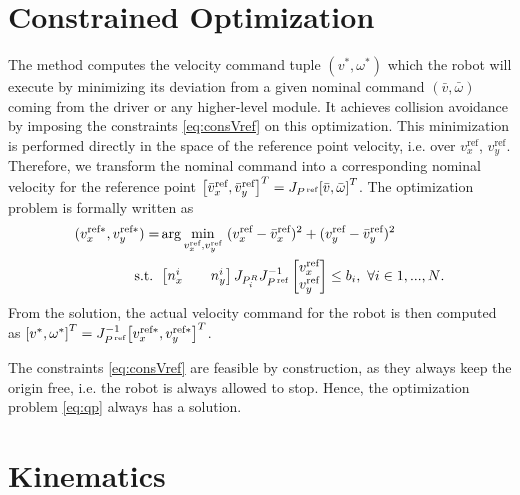 \documentclass{article}
\begin{document}
\section{Constrained Optimization}

The method computes the velocity command tuple $ (v^*,  \omega^* ) $ which the robot will execute by minimizing its deviation from a given nominal command $ (\bar v, \bar\omega) $ coming from the driver or any higher-level module. It achieves collision avoidance by imposing the constraints \eqref{eq:consVref} on this optimization. This minimization is performed directly in the space of the reference point velocity, i.e. over $ v_x^\text{ref} $, $ v_y^\text{ref} $. Therefore, we transform the nominal command into a corresponding nominal velocity for the reference point $ {\left[ \bar v_x^\text{ref}, \bar v_y^\text{ref} \right]}^T = J_{P^\text{\,ref}} {\left[ \bar v, \bar\omega  \right]}^T$. The optimization problem is formally written as
\begin{equation}\label{eq:qp}
\begin{aligned}
(v_x^{\text{ref}*}, v_y^{\text{ref}*}) = & \arg\min_{v_x^\text{ref}, v_y^\text{ref}}~ (v_x^\text{ref} - \bar v_x^\text{ref})^2 + (v_y^\text{ref} - \bar v_y^\text{ref})^2 \\
\text{s.t. } & \begin{bmatrix}
n_x^i && n_y^i
\end{bmatrix}
J_{P_i^R} J_{P^\text{\,ref}}^{-1}
\begin{bmatrix}
v_x^\text{ref} \\
v_y^\text{ref}
\end{bmatrix} \leq  b_i, ~\forall i \in {1, ..., N}.
\end{aligned}
\end{equation}
From the solution, the actual velocity command for the robot is then computed as $ {\left[ v^*, \omega^*  \right]}^T = J_{P^\text{\,ref}}^{-1} {\left[ v_x^{\text{ref}*}, v_y^{\text{ref}*} \right]}^T $.

The constraints \eqref{eq:consVref} are feasible by construction, as they always keep the origin free, i.e. the robot is always allowed to stop. Hence, the optimization problem \eqref{eq:qp} always has a solution.

\appendix

\section{Kinematics}\label{app:kinematics}
\end{document}
